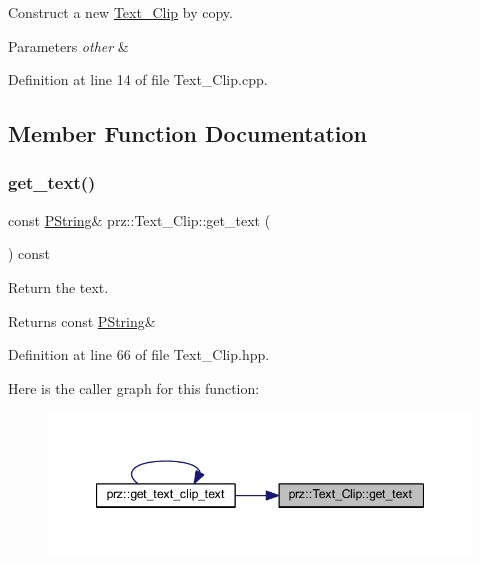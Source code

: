 Construct a new \mbox{\hyperlink{classprz_1_1_text___clip}{Text\+\_\+\+Clip}} by copy. 


\begin{DoxyParams}{Parameters}
{\em other} & \\
\hline
\end{DoxyParams}


Definition at line 14 of file Text\+\_\+\+Clip.\+cpp.



\subsection{Member Function Documentation}
\mbox{\label{classprz_1_1_text___clip_a9d7e0f330a7ced112c9e6acb6ec9f29d}} 
\subsubsection{\texorpdfstring{get\_text()}{get\_text()}}
{\footnotesize\ttfamily const \mbox{\hyperlink{classprz_1_1_p_string}{P\+String}}\& prz\+::\+Text\+\_\+\+Clip\+::get\+\_\+text (\begin{DoxyParamCaption}{ }\end{DoxyParamCaption}) const\hspace{0.3cm}{\ttfamily [inline]}}



Return the text. 

\begin{DoxyReturn}{Returns}
const \mbox{\hyperlink{classprz_1_1_p_string}{P\+String}}\& 
\end{DoxyReturn}


Definition at line 66 of file Text\+\_\+\+Clip.\+hpp.

Here is the caller graph for this function\+:
\nopagebreak
\begin{figure}[H]
\begin{center}
\leavevmode
\includegraphics[width=347pt]{classprz_1_1_text___clip_a9d7e0f330a7ced112c9e6acb6ec9f29d_icgraph}
\end{center}
\end{figure}
\mbox{\label{classprz_1_1_text___clip_a202deb59702755d44bcec29fc7e69f8c}} 
